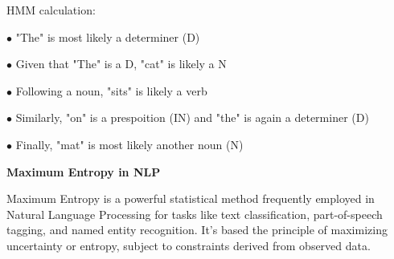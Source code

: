     HMM calculation: 
    
    $\bullet$ "The" is most likely a determiner (D)
    
    $\bullet$ Given that "The" is a D, "cat" is likely a N
    
    $\bullet$ Following a noun, "sits" is likely a verb
    
    $\bullet$ Similarly, "on" is a prespoition (IN) and "the" is again a determiner (D)
    
    $\bullet$ Finally, "mat" is most likely another noun (N)
    \vspace{1cm}
    
    \textbf{Maximum Entropy in NLP}
    
    Maximum Entropy is a powerful statistical method frequently employed in Natural Language Processing for tasks like text classification, part-of-speech
    tagging, and named entity recognition. It's based the principle of maximizing uncertainty or entropy, subject to constraints derived from observed data.
	
